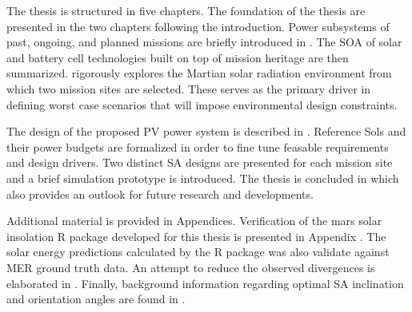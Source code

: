 The thesis is structured in five chapters. The foundation of the thesis are presented in the two chapters following the introduction. Power subsystems of past, ongoing, and planned missions are briefly introduced in . The \ac{SOA} of solar and battery cell technologies built on top of mission heritage are then summarized.  rigorously explores the Martian solar radiation environment from which two mission sites are selected. These serves as the primary driver in defining worst case scenarios that will impose environmental design constraints.

The design of the proposed \ac{PV} power system is described in . Reference Sols and their power budgets are formalized in order to fine tune feasable requirements and design drivers. Two distinct \ac{SA} designs are presented for each mission site and a brief simulation prototype is introduced. The thesis is concluded in  which also provides an outlook for future research and developments.

Additional material is provided in Appendices. Verification of the mars solar insolation R package developed for this thesis is presented in Appendix . The solar energy predictions calculated by the R package was also validate against \ac{MER} ground truth data. An attempt to reduce the observed divergences is elaborated in . Finally, background information regarding optimal \ac{SA} inclination and orientation angles are found in .

